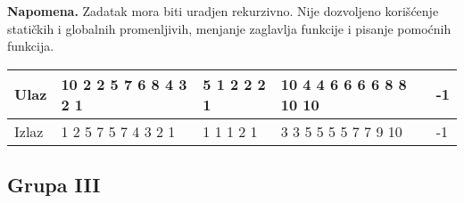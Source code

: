 \begin{enumerate}
\textbf{Napomena.} Zadatak mora biti uradjen rekurzivno. Nije dozvoljeno kori\v s\' cenje stati\v ckih i globalnih promenljivih, menjanje zaglavlja funkcije i pisanje pomo\' cnih funkcija. 

\small
\begin{tabular}{ |l|l|l|l|l| }
\hline 
  Ulaz  & 10 2 2 5 7 6 8 4 3 2 1 & 5 1 2 2 2 1 &  10 4 4 6 6 6 6 8 8 10 10& -1 \\ \hline 
  Izlaz & 1 2 5 7 5 7 4 3 2 1      &  1 1 1 2 1  &  3 3 5 5 5 5 7 7 9 10 & -1 \\ \hline  
\end{tabular}
\normalsize
\end{enumerate}


\subsection{Grupa III}


